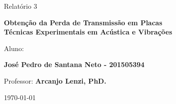 {\begin{capa}
\begin{figure}[!ht]
\begin{minipage}[c]{0.78\textwidth}
\begin{minipage}[t]{1\linewidth}
		\vspace{2cm}
		\Huge Relatório 3
		
	
		\vspace{1cm}
		 \textbf{Obtenção da Perda de Transmissão em Placas \\
		 	\Large{Técnicas Experimentais em Acústica e Vibrações}}
		
		\vspace{6cm}
		
		\large
		Aluno:
		
		\textbf{José Pedro de Santana Neto - 201505394}\\
		
		\vspace{6cm}
		
		
		\large
		Professor:
		\textbf{Arcanjo Lenzi, PhD.}
		
		
		\vspace{3cm}
		\vfill
		
		\today 
  \end{minipage}
\end{minipage}
\end{figure}	
	
\end{capa}

\restoregeometry








}
